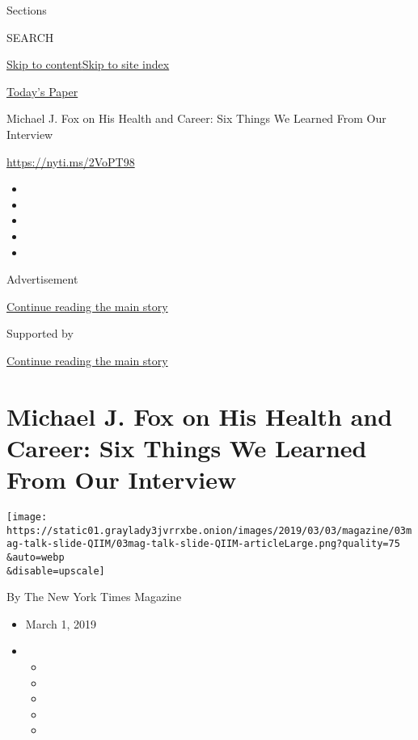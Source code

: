 Sections

SEARCH

\protect\hyperlink{site-content}{Skip to
content}\protect\hyperlink{site-index}{Skip to site index}

\href{https://myaccount.nytimes3xbfgragh.onion/auth/login?response_type=cookie\&client_id=vi}{}

\href{https://www.nytimes3xbfgragh.onion/section/todayspaper}{Today's
Paper}

Michael J. Fox on His Health and Career: Six Things We Learned From Our
Interview

\url{https://nyti.ms/2VoPT98}

\begin{itemize}
\item
\item
\item
\item
\item
\end{itemize}

Advertisement

\protect\hyperlink{after-top}{Continue reading the main story}

Supported by

\protect\hyperlink{after-sponsor}{Continue reading the main story}

\hypertarget{michael-j-fox-on-his-health-and-career-six-things-we-learned-from-our-interview}{%
\section{Michael J. Fox on His Health and Career: Six Things We Learned
From Our
Interview}\label{michael-j-fox-on-his-health-and-career-six-things-we-learned-from-our-interview}}

\texttt{[image: https://static01.graylady3jvrrxbe.onion/images/2019/03/03/magazine/03mag-talk-slide-QIIM/03mag-talk-slide-QIIM-articleLarge.png?quality=75\\\&auto=webp\\\&disable=upscale]}

By The New York Times Magazine

\begin{itemize}
\item
  March 1, 2019
\item
  \begin{itemize}
  \item
  \item
  \item
  \item
  \item
  \end{itemize}
\end{itemize}

